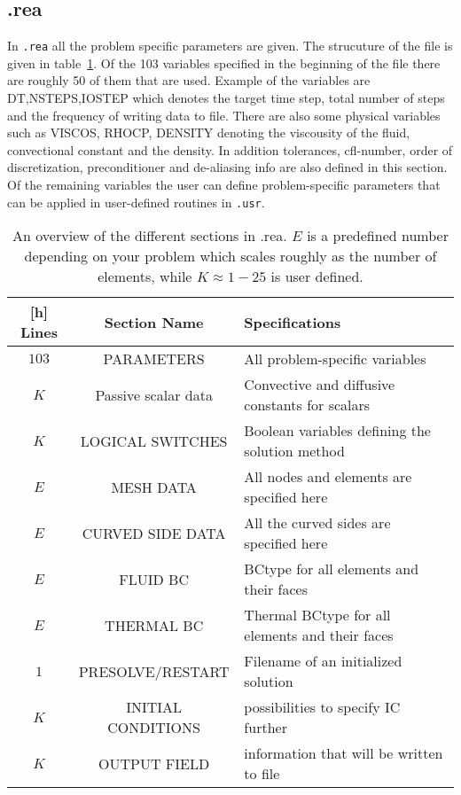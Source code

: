 \subsection{.rea}
In \verb|.rea| all the problem specific parameters are given. The strucuture of the file is given in table~\ref{tab:reafile}.
Of the 103 variables specified in the beginning of the file there are roughly 50 of them that are used. Example of the variables
are DT,NSTEPS,IOSTEP which denotes the target time step, total number of steps and the frequency of writing data to file. 
There are also some physical variables such as VISCOS, RHOCP, DENSITY denoting the viscousity of the fluid, convectional constant and 
the density. In addition tolerances, cfl-number, order of discretization, preconditioner and de-aliasing info are also defined in this section.
Of the remaining variables the user can define problem-specific parameters that can be applied in user-defined routines in \verb|.usr|.
%
\begin{table}
    \centering
    \begin{tabular}{c c l}[h]
       Lines & Section Name & Specifications \\ \hline
       $103$ & PARAMETERS & All problem-specific variables \\ 
       $K$ & Passive scalar data & Convective and diffusive constants for scalars\\ 
       $K$ & LOGICAL SWITCHES & Boolean variables defining the solution method \\ 
       $E$ & MESH DATA & All nodes and elements are specified here\\
       $E$ & CURVED SIDE DATA & All the curved sides are specified here\\
       $E$ & FLUID BC& BCtype for all elements and their faces\\
       $E$ & THERMAL BC& Thermal BCtype for all elements and their faces\\
       $1$ & PRESOLVE/RESTART & Filename of an initialized solution \\
       $K$ & INITIAL CONDITIONS & possibilities to specify IC further \\
       $K$ & OUTPUT FIELD & information that will be written to file \\
    \end{tabular}
    \caption{An overview of the different sections in .rea. $E$ is a predefined number depending on your problem
    which scales roughly as the number of elements, while $K\approx 1-25$ is user defined.}
    \label{tab:reafile}
\end{table}
%

